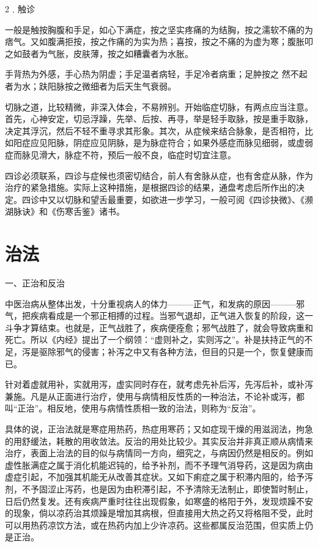 \documentclass[a4paper,12pt,UTF8,twoside]{ctexbook}
\begin{document}
2﹒触诊

一般是触按胸腹和手足，如心下满症，按之坚实疼痛的为结胸，按之濡软不痛的为痞气。又如腹满拒按，按之作痛的为实为热；喜按，按之不痛的为虚为寒；腹胀叩之如鼓者为气胀，皮肤薄，按之如糟囊者为水胀。

手背热为外感，手心热为阴虚；手足温者病轻，手足冷者病重；足肿按之 然不起者为水；趺阳脉按之微细者为后天生气衰弱。

切脉之道，比较精微，非深入体会，不易辨别。开始临症切脉，有两点应当注意。首先，心神安定，切忌浮躁，先举、后按、再寻，举是轻手取脉，按是重手取脉，决定其浮沉，然后不轻不重寻求其形象。其次，从症候来结合脉象，是否相符，比如阳症应见阳脉，阴症应见阴脉，是为脉症符合；如果外感症而脉见细弱，或虚弱症而脉见滑大，脉症不符，预后一般不良，临症时切宜注意。

四诊必须联系，四诊与症候也须密切结合，前人有舍脉从症，也有舍症从脉，作为治疗的紧急措施。实际上这种措施，是根据四诊的结果，通盘考虑后所作出的决定。四诊中又以切脉和望舌最重要，如欲进一步学习，一般可阅《四诊抉微》、《濒湖脉诀》和《伤寒舌鉴》诸书。

\section{治法}

一、正治和反治

中医治病从整体出发，十分重视病人的体力———正气，和发病的原因———邪气，把疾病看成是一个邪正相搏的过程。当邪气退却，正气进入恢复的阶段，这一斗争才算结束。也就是，正气战胜了，疾病便痊愈；邪气战胜了，就会导致病重和死亡。所以《内经》提出了一个纲领：“虚则补之，实则泻之”。补是扶持正气的不足，泻是驱除邪气的侵害；补泻之中又有各种方法，但目的只是一个，恢复健康而已。

针对着虚就用补，实就用泻，虚实同时存在，就考虑先补后泻，先泻后补，或补泻兼施。凡是从正面进行治疗，使用与病情相反性质的一种治法，不论补或泻，都叫“正治”。相反地，使用与病情性质相一致的治法，则称为“反治”。

具体的说，正治法就是寒症用热药，热症用寒药；又如症现干燥的用滋润法，拘急的用舒缓法，耗散的用收敛法。反治的用处比较少。其实反治并非真正顺从病情来治疗，表面上治法的目的似与病情同一方向，细究之，与病因仍然是相反的。例如虚性胀满症之属于消化机能迟钝的，给予补剂，而不予理气消导药，这是因为病由虚症引起，不加强其机能无从改善其症状。又如下痢症之属于积滞内阻的，给予泻剂，不予固涩止泻药，也是因为由积滞引起，不予清除无法制止，即使暂时制止，日后仍然复发。还有疾病严重时往往出现假象，如寒盛的格阳于外，发现烦躁不安的现象，倘以凉药治其烦躁是增加其病根，但直接用大热之药又将格阻不受，此时可以用热药凉饮方法，或在热药内加上少许凉药。这些都属反治范围，但实质上仍是正治。
\end{document}
